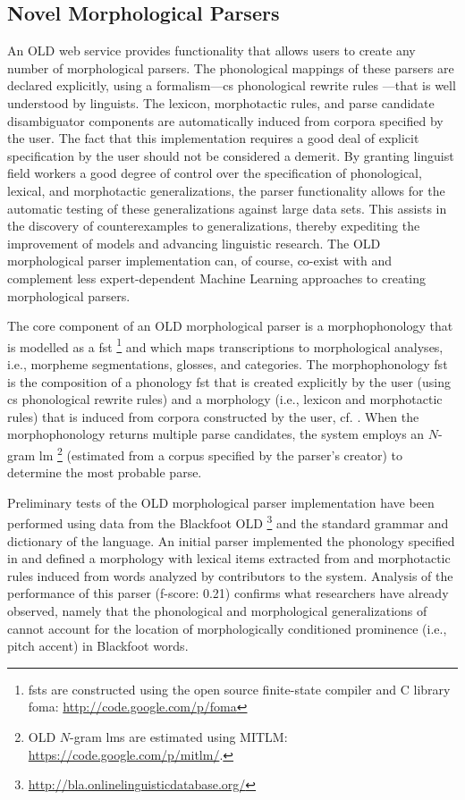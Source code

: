 \documentclass[11pt]{article}
\begin{document}
\subsection{Novel Morphological Parsers}
\label{sec:old-parsers}


An OLD web service provides functionality that allows users to create any
number of morphological parsers. The phonological mappings of these parsers
are declared explicitly, using a formalism---\gls{cs} phonological rewrite
rules \cite{chomsky68}---that is well understood by linguists. The lexicon,
morphotactic rules, and parse candidate disambiguator components are
automatically induced from corpora specified by the user. The fact that this
implementation requires a good deal of explicit specification by the user
should not be considered a demerit. By granting linguist field workers a good
degree of control over the specification of phonological, lexical, and
morphotactic generalizations, the parser functionality allows for the automatic
testing of these generalizations against large data sets. This assists
in the discovery of counterexamples to generalizations, thereby expediting
the improvement of models and advancing linguistic research. The OLD
morphological parser implementation can, of course, co-exist with and
complement less expert-dependent Machine Learning approaches to creating
morphological parsers.

The core component of an OLD morphological parser is a morphophonology that is
modelled as a \gls{fst}%
\footnote{\glspl{fst} are constructed using the open source finite-state
compiler and C library foma: \url{http://code.google.com/p/foma}} %
and which maps transcriptions to morphological analyses, i.e., morpheme
segmentations, glosses, and categories. The morphophonology \gls{fst} is the
composition of a phonology \gls{fst} that is created explicitly by the user
(using \gls{cs} phonological rewrite rules) and a morphology (i.e., lexicon and
morphotactic rules) that is induced from corpora constructed by the user, cf. 
\cite{beesley2003finite,hulden2012}. When the morphophonology returns multiple
parse candidates, the system employs an $N$-gram \gls{lm}%
\footnote{OLD $N$-gram \glspl{lm} are estimated using MITLM:
\url{https://code.google.com/p/mitlm/}.} %
(estimated from a corpus specified by the parser's creator) to determine the
most probable parse.

Preliminary tests of the OLD morphological parser implementation have been
performed using data from the Blackfoot OLD%
\footnote{\url{http://bla.onlinelinguisticdatabase.org/}} %
and the standard grammar \cite{frantz91} and dictionary \cite{frantz95} of the
language. An initial parser implemented the phonology specified in
\cite{frantz91} and defined a morphology with lexical items extracted from
\cite{frantz95} and morphotactic rules induced from words analyzed by
contributors to the system. Analysis of the performance of this parser
(f-score: 0.21) confirms what researchers \cite{weber2013} have already
observed, namely that the phonological and morphological generalizations of
\cite{frantz91} cannot account for the location of morphologically conditioned
prominence (i.e., pitch accent) in Blackfoot words.
\end{document}
